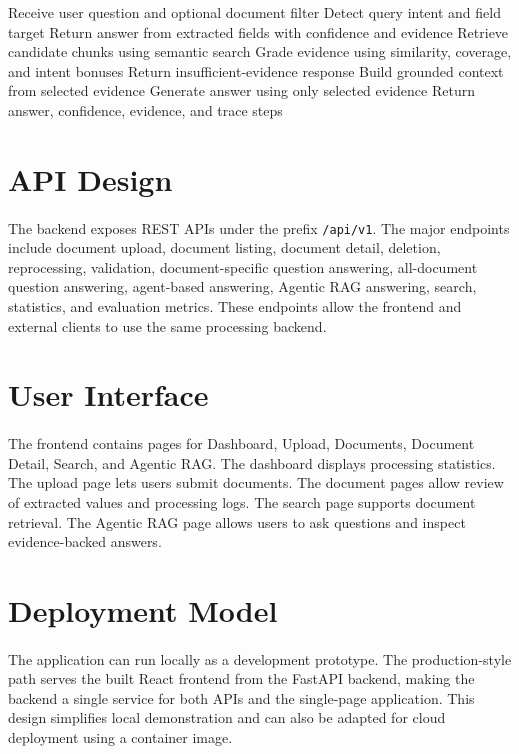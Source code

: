 \begin{algorithm}[h]
\caption{Agentic RAG Question Answering}
\label{alg:agentic_rag}
\begin{algorithmic}[1]
\State Receive user question and optional document filter
\State Detect query intent and field target
    \State Return answer from extracted fields with confidence and evidence
\Else
    \State Retrieve candidate chunks using semantic search
    \State Grade evidence using similarity, coverage, and intent bonuses
        \State Return insufficient-evidence response
    \Else
        \State Build grounded context from selected evidence
        \State Generate answer using only selected evidence
        \State Return answer, confidence, evidence, and trace steps
    \EndIf
\EndIf
\end{algorithmic}
\end{algorithm}

\section{API Design}
\paragraph{} The backend exposes REST APIs under the prefix \texttt{/api/v1}. The major endpoints include document upload, document listing, document detail, deletion, reprocessing, validation, document-specific question answering, all-document question answering, agent-based answering, Agentic RAG answering, search, statistics, and evaluation metrics. These endpoints allow the frontend and external clients to use the same processing backend.

\section{User Interface}
\paragraph{} The frontend contains pages for Dashboard, Upload, Documents, Document Detail, Search, and Agentic RAG. The dashboard displays processing statistics. The upload page lets users submit documents. The document pages allow review of extracted values and processing logs. The search page supports document retrieval. The Agentic RAG page allows users to ask questions and inspect evidence-backed answers.

\section{Deployment Model}
\paragraph{} The application can run locally as a development prototype. The production-style path serves the built React frontend from the FastAPI backend, making the backend a single service for both APIs and the single-page application. This design simplifies local demonstration and can also be adapted for cloud deployment using a container image.
